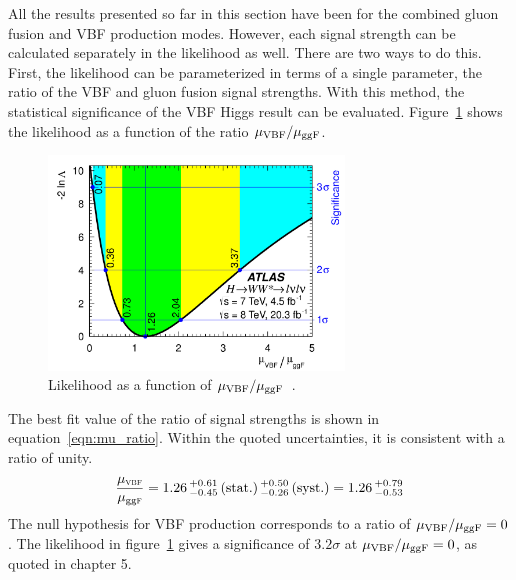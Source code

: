 All the results presented so far in this section have been for the combined gluon fusion and VBF production modes. However, each signal strength can be calculated separately in the likelihood as well. There are two ways to do this. First, the likelihood can be parameterized in terms of a single parameter, the ratio of the VBF and gluon fusion signal strengths. With this method, the statistical significance of the VBF Higgs result can be evaluated. Figure~\ref{fig:mu_ratio} shows the likelihood as a function of the ratio $\mu_{{\rm VBF}}/\mu_{{\rm ggF}}$.
%
\begin{figure}[h!]
  \centering
  \captionsetup{justification=centering}

  \includegraphics[width=0.7\textwidth]{figures/WW_muratio}
  \caption{Likelihood as a function of $\mu_{{\rm VBF}}/\mu_{{\rm ggF}}$~\cite{WW2015}.}
  \label{fig:mu_ratio}
\end{figure}
%
The best fit value of the ratio of signal strengths is shown in equation~\ref{eqn:mu_ratio}. Within the quoted uncertainties, it is consistent with a ratio of unity. 
%
\begin{equation}
  \frac{\mu_{{\textsc{\scriptsize vbf}}}}{\mu_{{\tiny\rm gg}{\textsc{\scriptsize f}}}} 
  = 1.26\,^{+0.61}_{-0.45}\,(\rm{stat.})\,^{+0.50}_{-0.26}\,(\rm{syst.})
  = 1.26\,^{+0.79}_{-0.53} 
\label{eqn:mu_ratio}
\end{equation}
%
The null hypothesis for VBF production corresponds to a ratio of $\mu_{{\rm VBF}}/\mu_{{\rm ggF}} = 0$. The likelihood in figure~\ref{fig:mu_ratio} gives a significance of $3.2\sigma$ at $\mu_{{\rm VBF}}/\mu_{{\rm ggF}} = 0$, as quoted in chapter 5. 


